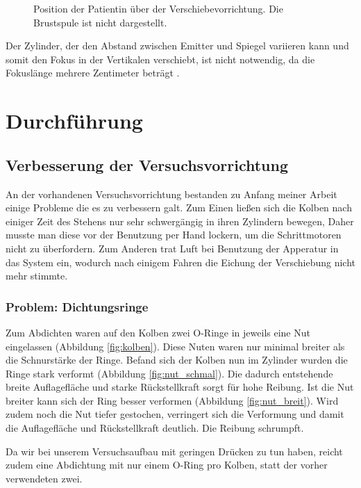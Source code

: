 \documentclass[
    11pt,
    ngerman
]{scrreprt}
\begin{document}
\begin{figure}[htbp]
    \centering
    \resizebox{.9\textwidth}{!}{}
    \caption{%
        Position der Patientin über der Verschiebevorrichtung. Die Brustspule ist nicht dargestellt.
    }
    \label{fig:aufbau_emitter_spiegel}
\end{figure}

Der Zylinder, der den Abstand zwischen Emitter und Spiegel variieren kann und
somit den Fokus in der Vertikalen verschiebt, ist nicht notwendig, da die
Fokuslänge mehrere Zentimeter beträgt \parencite{dipl_kofahl}.

\chapter{Durchführung}

\section{Verbesserung der Versuchsvorrichtung}

An der vorhandenen Versuchsvorrichtung bestanden zu Anfang meiner Arbeit einige
Probleme die es zu verbessern galt. Zum Einen ließen sich die Kolben nach
einiger Zeit des Stehens nur sehr schwergängig in ihren Zylindern bewegen,
Daher musste man diese vor der Benutzung per Hand lockern, um die
Schrittmotoren nicht zu überfordern. Zum Anderen trat Luft bei Benutzung der
Apperatur in das System ein, wodurch nach einigem Fahren die Eichung der
Verschiebung nicht mehr stimmte.  

\subsection{Problem: Dichtungsringe}

Zum Abdichten waren auf den Kolben zwei O-Ringe in jeweils eine Nut
eingelassen (Abbildung \ref{fig:kolben}). Diese Nuten waren nur minimal
breiter als die Schnurstärke der Ringe. Befand sich der Kolben nun im Zylinder
wurden die Ringe stark verformt (Abbildung \ref{fig:nut_schmal}). Die dadurch
entstehende breite Auflagefläche und starke Rückstellkraft sorgt für hohe
Reibung. Ist die Nut breiter kann sich der Ring besser verformen (Abbildung
\ref{fig:nut_breit}). Wird zudem noch die Nut tiefer gestochen, verringert
sich die Verformung und damit die Auflagefläche und Rückstellkraft deutlich.
Die Reibung schrumpft.

Da wir bei unserem Versuchsaufbau mit geringen Drücken zu tun haben, reicht
zudem eine Abdichtung mit nur einem O-Ring pro Kolben, statt der vorher
verwendeten zwei.
\end{document}
